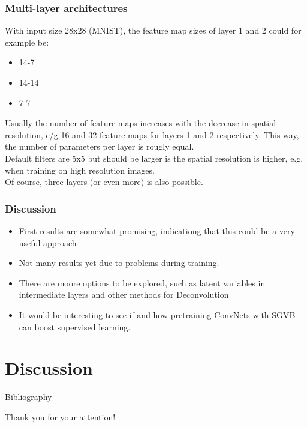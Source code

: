 \documentclass{beamer}
\begin{document}
\begin{frame}
\frametitle{Multi-layer architectures}
With input size 28x28 (MNIST), the feature map sizes of layer 1 and 2 could for example be:
\begin{itemize}
\item 14-7 
\item 14-14
\item 7-7
\end{itemize}
Usually the number of feature maps increases with the decrease in spatial resolution, e/g 16 and 32 feature maps for layers 1 and 2 respectively. This way, the number of parameters per layer is rougly equal. \\
Default filters are 5x5 but should be larger is the spatial resolution is higher, e.g. when training on high resolution images. \\
Of course, three layers (or even more) is also possible.
\end{frame}

\begin{frame}
\frametitle{Discussion}
	\begin{itemize}
		\item First results are somewhat promising, indicationg that this could be a very useful approach
		\item Not many results yet due to problems during training.
		\item There are moore options to be explored, such as latent variables in intermediate layers and other methods for Deconvolution
		\item It would be interesting to see if and how pretraining ConvNets with SGVB can boost supervised learning.
	\end{itemize}
\end{frame}

\section{Discussion}


\begin{frame}{Bibliography}
	\nocite{*}
	
	
\end{frame}


\begin{frame}
\Huge{\centerline{Thank you for your attention!}}
\end{frame}

\end{document}
